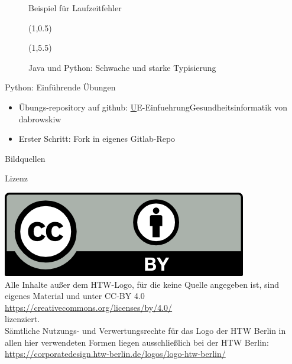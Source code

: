 \documentclass[aspectratio=169,t]{beamer}
\begin{document}
\begin{frame}[fragile]{}
{\begin{textblock}{10}
\begin{figure}
                \caption{Beispiel für Laufzeitfehler}
            \end{figure}
        \end{textblock}    
    }
     {
        \begin{figure}
            \begin{textblock}{14}(1,0.5)
                
            \end{textblock}    
            \begin{textblock}{14}(1,5.5)
                
                \caption{Java und Python: Schwache und starke Typisierung}
            \end{textblock}    
        \end{figure}
    }
\end{frame}

\begin{frame}{Python: Einführende Übungen}
    \begin{itemize}
        \item Übungs-repository auf github: \href{https://github.com/dabrowskiw/UE-EinfuehrungGesundheitsinformatik}UE-EinfuehrungGesundheitsinformatik von dabrowskiw
        \item Erster Schritt: Fork in eigenes Gitlab-Repo
    \end{itemize}
\end{frame}


\begin{frame}[allowframebreaks]{Bildquellen}
\printbibliography
\end{frame}

\begin{frame}{Lizenz}
    \begin{center}
        \includegraphics{Bilder/by.png}\\
        Alle Inhalte außer dem HTW-Logo, für die keine Quelle angegeben ist, sind eigenes Material und unter CC-BY 4.0\\
        \url{https://creativecommons.org/licenses/by/4.0/}\\
        lizenziert.\\\vspace{0.5cm}
        Sämtliche Nutzungs- und Verwertungsrechte für das Logo der HTW Berlin in allen hier verwendeten Formen liegen ausschließlich bei der HTW Berlin:\\
        \url{https://corporatedesign.htw-berlin.de/logos/logo-htw-berlin/}
    \end{center}
\end{frame}
\end{document}
